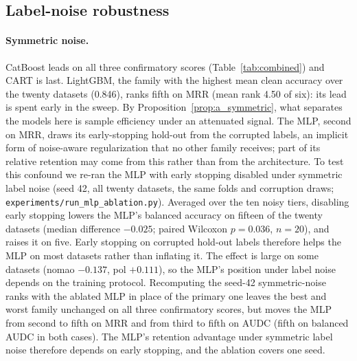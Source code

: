 \documentclass[pdflatex,sn-mathphys]{sn-jnl}
\theoremstyle{thmstyleone}
\theoremstyle{thmstyletwo}
\theoremstyle{thmstylethree}
\begin{document}
\subsection{Label-noise robustness}\label{sec:res:label}

\paragraph{Symmetric noise.} CatBoost leads on all three confirmatory scores (Table~\ref{tab:combined}) and CART is last. LightGBM, the family with the highest mean clean accuracy over the twenty datasets (0.846), ranks fifth on MRR (mean rank 4.50 of six): its lead is spent early in the sweep. By Proposition~\ref{prop:a_symmetric}, what separates the models here is sample efficiency under an attenuated signal. The MLP, second on MRR, draws its early-stopping hold-out from the corrupted labels, an implicit form of noise-aware regularization that no other family receives; part of its relative retention may come from this rather than from the architecture. To test this confound we re-ran the MLP with early stopping disabled under symmetric label noise (seed 42, all twenty datasets, the same folds and corruption draws; \texttt{experiments/run\_mlp\_ablation.py}). Averaged over the ten noisy tiers, disabling early stopping lowers the MLP's balanced accuracy on fifteen of the twenty datasets (median difference $-0.025$; paired Wilcoxon $p=0.036$, $n=20$), and raises it on five. Early stopping on corrupted hold-out labels therefore helps the MLP on most datasets rather than inflating it. The effect is large on some datasets (nomao $-0.137$, pol $+0.111$), so the MLP's position under label noise depends on the training protocol. Recomputing the seed-42 symmetric-noise ranks with the ablated MLP in place of the primary one leaves the best and worst family unchanged on all three confirmatory scores, but moves the MLP from second to fifth on MRR and from third to fifth on AUDC (fifth on balanced AUDC in both cases). The MLP's retention advantage under symmetric label noise therefore depends on early stopping, and the ablation covers one seed.
\end{document}
